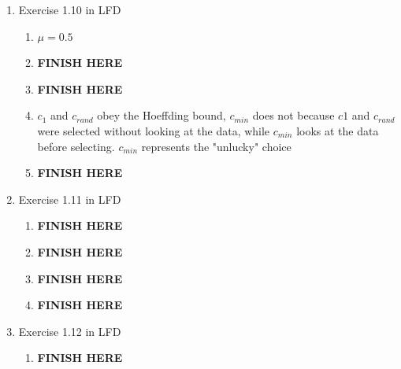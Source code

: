 \documentclass{article}
\begin{document}
\begin{enumerate}
        \item Exercise 1.10 in LFD
        \begin{enumerate}[label=(\alph*)]
            \item $\mu = 0.5$
            \item \textbf{FINISH HERE}
            \item \textbf{FINISH HERE}
            \item $c_1$ and $c_{rand}$ obey the Hoeffding bound, $c_{min}$ does not because $c1$ and $c_{rand}$ were selected without looking at the data, while $c_{min}$ looks at the data before selecting. $c_{min}$ represents the "unlucky" choice
            \item \textbf{FINISH HERE}
        \end{enumerate}

        \item Exercise 1.11 in LFD
        \begin{enumerate}[label=(\alph*)]
            \item \textbf{FINISH HERE}
            \item \textbf{FINISH HERE}
            \item \textbf{FINISH HERE}
            \item \textbf{FINISH HERE}
        \end{enumerate}

        \item Exercise 1.12 in LFD
        \begin{enumerate}[label=(\alph*)]
            \item \textbf{FINISH HERE}
        \end{enumerate}
    \end{enumerate}
\end{document}
